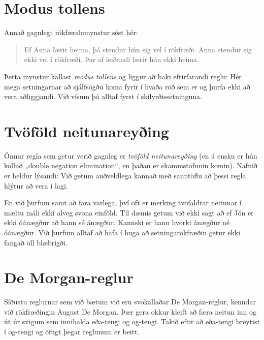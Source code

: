 \section{Modus tollens}

Annað gagnlegt rökfærslumynstur sést hér:

\begin{quote}
	Ef Anna lærir heima, þá stendur hún sig vel í rökfræði. Anna stendur sig ekki vel í rökfræði. Þar af leiðandi lærir hún ekki heima.
\end{quote}

Þetta mynstur kallast \emph{modus tollens} og liggur að baki eftirfarandi reglu:
Hér mega setningarnar að sjálfsögðu koma fyrir í hvaða röð sem er og þurfa ekki að vera aðliggjandi. Við vísum þó alltaf fyrst í skilyrðissetninguna.

\section{Tvöföld neitunareyðing}

Önnur regla sem getur verið gagnleg er \emph{tvöföld neitunareyðing} (en á ensku er hún kölluð „double negation elimination“, en þaðan er skammstöfunin komin). Nafnið er heldur lýsandi:
Við getum auðveldlega kannað með sanntöflu að þessi regla hlýtur að vera í lagi. 

En við þurfum samt að fara varlega, því oft er merking tvöfaldrar neitunar í mæltu máli ekki alveg svona einföld. Til dæmis getum við ekki sagt að ef Jón er ekki óánægður að hann sé ánægður. Kannski er hann hvorki ánægður né óánægður. Við þurfum alltaf að hafa í huga að setningarökfræðin getur ekki fangað öll blæbrigði.

\section{De Morgan-reglur}

Síðustu reglurnar sem við bætum við eru svokallaðar De Morgan-reglur, kenndar við rökfræðingin August De Morgan. Þær gera okkur kleift að færa neitun inn og út úr svigum sem innihalda eða-tengi og og-tengi. Takið eftir að eða-tengi breytist í og-tengi og öfugt þegar reglunum er beitt.


